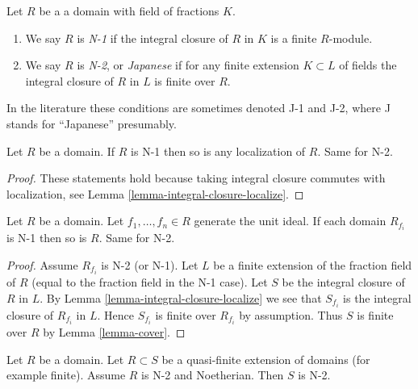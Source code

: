 \begin{definition}
\label{definition-N}
Let $R$ be a a domain with field of fractions $K$.
\begin{enumerate}
\item We say $R$ is {\it N-1} if the integral closure of $R$ in $K$
is a finite $R$-module.
\item We say $R$ is {\it N-2}, or {\it Japanese} if for any finite
extension $K \subset L$ of fields the integral closure of $R$ in $L$
is finite over $R$.
\end{enumerate}
\end{definition}

\noindent
In the literature these conditions are sometimes denoted
J-1 and J-2, where J stands for ``Japanese'' presumably.

\begin{lemma}
\label{lemma-localize-N}
Let $R$ be a domain.
If $R$ is N-1 then so is any localization of $R$.
Same for N-2.
\end{lemma}

\begin{proof}
These statements hold because taking integral closure commutes
with localization, see Lemma \ref{lemma-integral-closure-localize}.
\end{proof}

\begin{lemma}
\label{lemma-Japanese-local}
Let $R$ be a domain. Let $f_1, \ldots, f_n \in R$ generate the
unit ideal. If each domain $R_{f_i}$ is N-1 then so is $R$.
Same for N-2.
\end{lemma}

\begin{proof}
Assume $R_{f_i}$ is N-2 (or N-1).
Let $L$ be a finite extension of the fraction field of $R$ (equal to
the fraction field in the N-1 case). Let $S$ be the integral
closure of $R$ in $L$. By Lemma \ref{lemma-integral-closure-localize}
we see that $S_{f_i}$ is the integral closure of $R_{f_i}$ in $L$.
Hence $S_{f_i}$ is finite over $R_{f_i}$ by assumption.
Thus $S$ is finite over $R$ by Lemma \ref{lemma-cover}.
\end{proof}

\begin{lemma}
\label{lemma-quasi-finite-over-Noetherian-japanese}
Let $R$ be a domain.
Let $R \subset S$ be a quasi-finite extension of domains
(for example finite).
Assume $R$ is N-2 and Noetherian.
Then $S$ is N-2.
\end{lemma}

